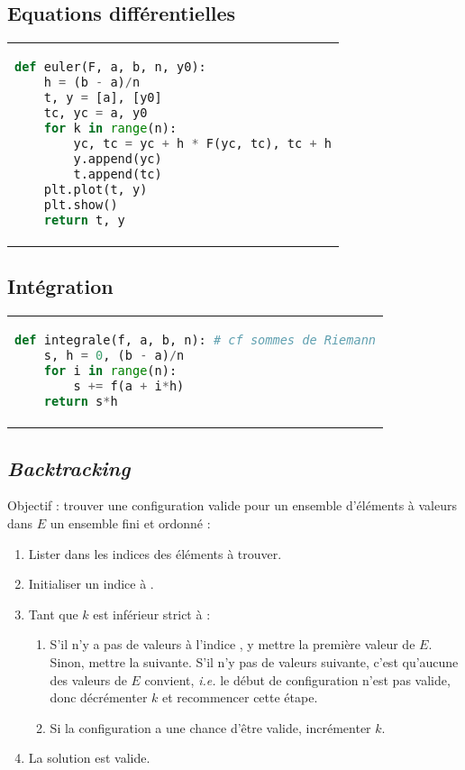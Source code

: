 \documentclass{hibiscus}
\begin{document}
\subsection{Equations différentielles}

\begin{tabular}{l}
\begin{lstlisting}[language=Python]
def euler(F, a, b, n, y0):
    h = (b - a)/n
    t, y = [a], [y0]
    tc, yc = a, y0
    for k in range(n):
        yc, tc = yc + h * F(yc, tc), tc + h
        y.append(yc)
        t.append(tc)
    plt.plot(t, y)
    plt.show()
    return t, y
\end{lstlisting}
\end{tabular}

\subsection{Intégration}

\begin{tabular}{l}
\begin{lstlisting}[language=Python]
def integrale(f, a, b, n): # cf sommes de Riemann
    s, h = 0, (b - a)/n
    for i in range(n):
        s += f(a + i*h)
    return s*h
\end{lstlisting}
\end{tabular}

\subsection{\textit{Backtracking}}

\par Objectif : trouver une configuration valide pour un ensemble d'éléments à valeurs dans $E$ un ensemble fini et ordonné :

\begin{enumerate}
\item Lister dans  les indices des éléments à trouver.
\item Initialiser un indice  à .
\item Tant que $k$ est inférieur strict à  :
    \begin{enumerate}
    \item S'il n'y a pas de valeurs à l'indice , y mettre la première valeur de $E$. Sinon, mettre la suivante. S'il n'y pas de valeurs suivante, c'est qu'aucune des valeurs de $E$ convient, \textit{i.e.} le début de configuration n'est pas valide, donc décrémenter $k$ et recommencer cette étape.
    \item Si la configuration a une chance d'être valide, incrémenter $k$.
    \end{enumerate}
\item La solution est valide.
\end{enumerate}
\end{document}
